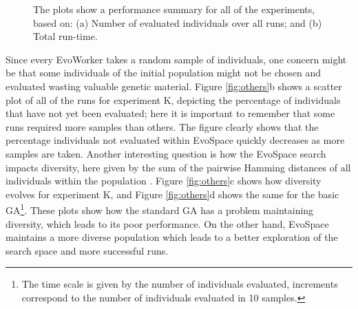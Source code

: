 \begin{figure}[t]
    \centering
    \caption{The plots show a performance summary for all of the experiments, based on:
    (a) Number of evaluated individuals over all runs; and (b) Total run-time.}

    \label{fig:effort}
\end{figure}

Since every EvoWorker takes a random sample of individuals, one concern might be that some individuals of the initial population might
not be chosen and evaluated wasting valuable genetic material.
Figure \ref{fig:others}b shows a scatter plot of all of the runs for experiment K, depicting the percentage of individuals
that have not yet been evaluated; here it is important to remember that some runs required more samples than others.
The figure clearly shows that the percentage individuals not evaluated within EvoSpace quickly decreases as more samples are taken.
Another interesting question is how the EvoSpace search impacts diversity, here given by the sum of the pairwise Hamming distances
of all individuals within the population \cite{diversity}.
Figure \ref{fig:others}c shows how diversity evolves for experiment K, and
Figure \ref{fig:others}d shows the same for the basic GA\footnote{The time scale is given by
the number of individuals evaluated, increments correspond to the number of individuals evaluated in 10 samples.}.
These plots show how the standard GA has a problem maintaining diversity, which leads to its poor performance.
On the other hand, EvoSpace maintains a more diverse population which leads to a better exploration of the search space and more successful runs.

